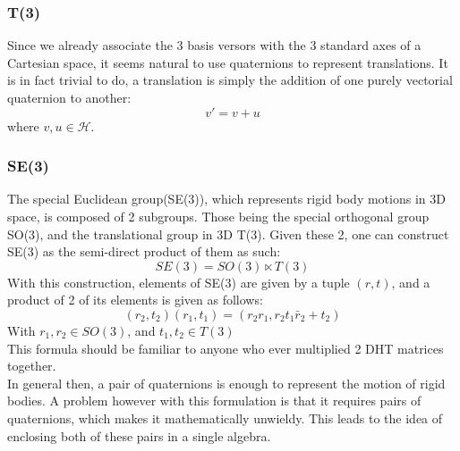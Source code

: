 \clearpage

\subsubsection{T(3)}

Since we already associate the 3 basis versors with the 3 standard axes of a Cartesian space, it seems natural to use quaternions to represent translations. It is in fact trivial to do, a translation is simply the addition of one purely vectorial quaternion to another:
\begin{equation}
    v' = v + u
\end{equation}
where $v,u\in \mathcal{H}$.
\subsubsection{SE(3)}
The special Euclidean group(SE(3)), which represents rigid body motions in 3D space, is composed of 2 subgroups. Those being the special orthogonal group SO(3), and the translational group in 3D T(3). Given these 2, one can construct SE(3) as the semi-direct product of them as such:
\begin{equation}
    SE(3) = SO(3)\ltimes T(3)
\end{equation}
With this construction, elements of SE(3) are given by a tuple  $(r,t)$, and a product of 2 of its elements is given as follows:
 \begin{equation}
     \label{semidirect}
     (r_2,t_2)(r_1,t_1) = (r_2r_1,r_2t_1\bar{r}_2+t_2)
\end{equation}
With $r_1,r_2\in SO(3)$, and $t_1,t_2 \in T(3)$\\
This formula should be familiar to anyone who ever multiplied 2 DHT matrices together.\\
In general then, a pair of quaternions is enough to represent the motion of rigid bodies. A problem however with this formulation is that it requires pairs of quaternions, which makes it mathematically unwieldy. This leads to the idea of enclosing both of these pairs in a single algebra.
